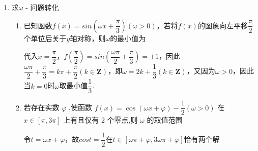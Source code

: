 \begin{enumerate}
\begin{enumerate}
    \item 若函数 $f\left( x\right)  = 2\sin \left( {{\omega x} - \dfrac{\pi }{6}}\right) \left( {\omega  > 0}\right)$ 在区间 $\left( {0,\dfrac{\pi }{4}}\right)$ 上单调,则 $\omega$ 的取值范围为\blkda{$\left(0, \dfrac{8}{3}\right]$}
    
    \item 函数 $y = \sin \left( {{\omega x} - \dfrac{\pi }{6}}\right) \left( {\omega  > 0}\right)$ 在 $\left\lbrack  {0,\pi }\right\rbrack$ 上有且仅有 3 个零点,则实数 $\omega$ 的取值范围是\blkda{$\left[\dfrac{13}{6}, \dfrac{19}{6}\right)$}
    

    \item 已知函数 $f\left( x\right)  = \cos \left( {{\omega x} - \dfrac{\pi }{6}}\right) \left( {\omega  > 0}\right)$ 在区间 $\left( {\dfrac{7\pi }{6\omega },{2\pi }}\right\rbrack$ 上有且只有 3 个零点,则 $\omega$ 的取值范围是\blkda{$\left[\dfrac{11}{6}, \dfrac{7}{3}\right)$}
    
    \item 已知函数 $f\left( x\right)  = \cos {\omega x} - 1\left( {\omega  > 0}\right)$ 在区间 $\left\lbrack  {0,{2\pi }}\right\rbrack$ 有且仅有 3 个零点,则 $\omega$ 的取值范围是\blkda{$[2, 3)$}
\end{enumerate}
\item 求$\omega$ - 问题转化
\begin{enumerate}
    
    \item 已知函数$f(x) = sin\left(\omega x + \dfrac{\pi}{3}\right) (\omega > 0)$，若将$f(x)$的图象向左平移$\dfrac{\pi}{2}$个单位后关于$y$轴对称，则$\omega$的最小值为
        \begin{jieda}
            代入$x = \dfrac{\pi}{2}$，$f\left(\dfrac{\pi}{2}\right) = sin\left(\dfrac{\omega \pi}{2} + \dfrac{\pi}{3}\right) = \pm 1$，因此$\dfrac{\omega \pi}{2} + \dfrac{\pi}{3} = k\pi + \dfrac{\pi}{2} (k \in \mathbf{Z})$，即$\omega = 2k + \dfrac{1}{3} (k \in \mathbf{Z})$，又因为$\omega > 0$，因此当$k = 0$时$\omega$取最小值$\dfrac{1}{3}$.
        \end{jieda}
    
    \item 若存在实数 $\varphi$ ,使函数 $f\left( x\right)  = \cos \left( {{\omega x} + \varphi }\right)  - \dfrac{1}{2}\left( {\omega  > 0}\right)$ 在 $x \in  \left\lbrack  {\pi ,{3\pi }}\right\rbrack$ 上有且仅有 2 个零点,则 $\omega$ 的取值范围\blkda{$\left[\dfrac{1}{3}, \dfrac{5}{3}\right)$}
    \begin{jieda}
        令$t = \omega x + \varphi$，故$cos t  = \dfrac{1}{2}$在$t \in [\omega \pi + \varphi, 3\omega \pi + \varphi]$恰有两个解


\end{jieda}
\end{enumerate}
\end{enumerate}

